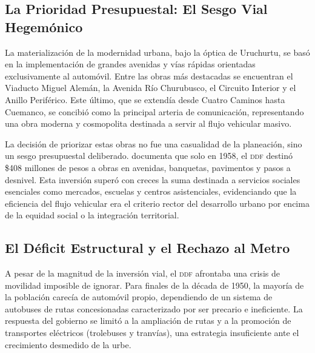 \subsection{La Prioridad Presupuestal: El Sesgo Vial Hegemónico}
\label{subsec:sesgo-vial}

La materialización de la modernidad urbana, bajo la óptica de Uruchurtu, se basó
en
la implementación de grandes avenidas y vías rápidas orientadas exclusivamente
al
automóvil. Entre las obras más destacadas se encuentran el Viaducto Miguel
Alemán,
la Avenida Río Churubusco, el Circuito Interior y el Anillo Periférico. Este
último,
que se extendía desde Cuatro Caminos hasta Cuemanco, se concibió como la
principal arteria de comunicación, representando una obra moderna y cosmopolita
destinada a servir al flujo vehicular masivo.

La decisión de priorizar estas obras no fue una casualidad de la planeación,
sino un
sesgo presupuestal deliberado. \citet[Tomo~1, p.~391]{perlo2023} documenta
que
solo en 1958, el \textsc{ddf} destinó \$408 millones de pesos a obras en
avenidas,
banquetas, pavimentos y pasos a desnivel. Esta inversión superó con creces la
suma
destinada a servicios sociales esenciales como mercados, escuelas y centros
asistenciales, evidenciando que la eficiencia del flujo vehicular era el
criterio rector
del desarrollo urbano por encima de la equidad social o la integración
territorial.

\subsection{El Déficit Estructural y el Rechazo al Metro}
\label{subsec:rechazo-metro}

A pesar de la magnitud de la inversión vial, el \textsc{ddf} afrontaba una
crisis de
movilidad imposible de ignorar. Para finales de la década de 1950, la mayoría de
la
población carecía de automóvil propio, dependiendo de un sistema de autobuses de
rutas concesionadas caracterizado por ser precario e ineficiente. La respuesta
del
gobierno se limitó a la ampliación de rutas y a la promoción de transportes
eléctricos
(trolebuses y tranvías), una estrategia insuficiente ante el crecimiento
desmedido
de la urbe.

